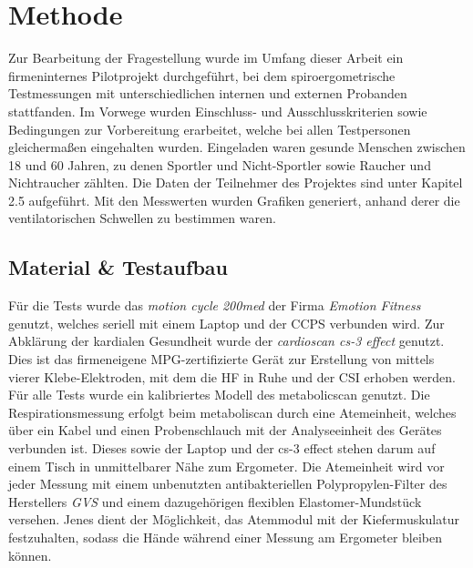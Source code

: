 \chapter{Methode}
%
Zur Bearbeitung der Fragestellung wurde im Umfang dieser Arbeit ein firmeninternes Pilotprojekt durchgeführt, bei dem spiroergometrische Testmessungen mit unterschiedlichen internen und externen Probanden stattfanden. Im Vorwege wurden Einschluss- und Ausschlusskriterien sowie Bedingungen zur Vorbereitung erarbeitet, welche bei allen Testpersonen gleichermaßen eingehalten wurden. Eingeladen waren gesunde Menschen zwischen 18 und 60 Jahren, zu denen Sportler und Nicht-Sportler sowie Raucher und Nichtraucher zählten. Die Daten der Teilnehmer des Projektes sind unter Kapitel 2.5 aufgeführt. Mit den Messwerten wurden Grafiken generiert, anhand derer die ventilatorischen Schwellen zu bestimmen waren.
%
\section{Material \& Testaufbau}
%
Für die Tests wurde das \textsl{motion cycle 200med} der Firma \textsl{Emotion Fitness} genutzt, welches seriell mit einem Laptop und der \gls{CCPS} verbunden wird. Zur Abklärung der kardialen Gesundheit wurde der \textsl{cardioscan cs-3 effect} genutzt. Dies ist das firmeneigene MPG-zertifizierte Gerät zur Erstellung von  mittels vierer Klebe-Elektroden, mit dem die \gls{HF} in Ruhe und der \gls{CSI} erhoben werden. Für alle Tests wurde ein kalibriertes Modell des metabolicscan genutzt. Die Respirationsmessung erfolgt beim metaboliscan durch eine Atemeinheit, welches über ein Kabel und einen Probenschlauch mit der Analyseeinheit des Gerätes verbunden ist. Dieses sowie der Laptop und der cs-3 effect stehen darum auf einem Tisch in unmittelbarer Nähe zum Ergometer. Die Atemeinheit wird vor jeder Messung mit einem unbenutzten antibakteriellen Polypropylen-Filter des Herstellers \textsl{GVS} und einem dazugehörigen flexiblen Elastomer-Mundstück versehen. Jenes dient der Möglichkeit, das Atemmodul mit der Kiefermuskulatur festzuhalten, sodass die Hände während einer Messung am Ergometer bleiben können.
\clearpage
